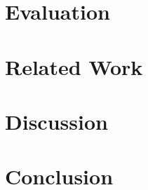 \documentclass[12pt,twoside]{report}
\theoremstyle{plain}
\theoremstyle{definition}
\begin{document}
\chapter{Evaluation}
\label{evaluation}




\chapter{Related Work}
\label{related_work}



\chapter{Discussion}
\label{discussion}


\chapter{Conclusion}
\label{conclusion}

\clearpage
\appendix
\pagebreak
\begin{appendices}





\end{appendices}






\end{document}
